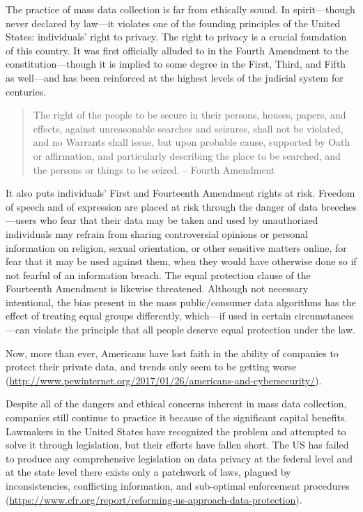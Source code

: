 \documentclass[water,article,submit,moreauthors,pdftex]{mdpi}
\begin{document}
The practice of mass data collection is far from ethically sound. In
spirit---though never declared by law---it violates one of the founding
principles of the United States: individuals' right to privacy. The
right to privacy is a crucial foundation of this country. It was first
officially alluded to in the Fourth Amendment to the
constitution---though it is implied to some degree in the First, Third,
and Fifth as well---and has been reinforced at the highest levels of the
judicial system for centuries.

\begin{quote}
The right of the people to be secure in their persons, houses, papers,
and effects, against unreasonable searches and seizures, shall not be
violated, and no Warrants shall issue, but upon probable cause,
supported by Oath or affirmation, and particularly describing the place
to be searched, and the persons or things to be seized. -- Fourth
Amendment
\end{quote}

It also puts individuals' First and Fourteenth Amendment rights at risk.
Freedom of speech and of expression are placed at risk through the
danger of data breeches---users who fear that their data may be taken
and used by unauthorized individuals may refrain from sharing
controversial opinions or personal information on religion, sexual
orientation, or other sensitive matters online, for fear that it may be
used against them, when they would have otherwise done so if not fearful
of an information breach. The equal protection clause of the Fourteenth
Amendment is likewise threatened. Although not necessary intentional,
the bias present in the mass public/consumer data algorithms has the
effect of treating equal groups differently, which---if used in certain
circumstances---can violate the principle that all people deserve equal
protection under the law.

Now, more than ever, Americans have lost faith in the ability of
companies to protect their private data, and trends only seem to be
getting worse
(\url{http://www.pewinternet.org/2017/01/26/americans-and-cybersecurity/}).

Despite all of the dangers and ethical concerns inherent in mass data
collection, companies still continue to practice it because of the
significant capital benefits. Lawmakers in the United States have
recognized the problem and attempted to solve it through legislation,
but their efforts have fallen short. The US has failed to produce any
comprehensive legislation on data privacy at the federal level and at
the state level there exists only a patchwork of laws, plagued by
inconsistencies, conflicting information, and sub-optimal enforcement
procedures
(\url{https://www.cfr.org/report/reforming-us-approach-data-protection}).
\end{document}
